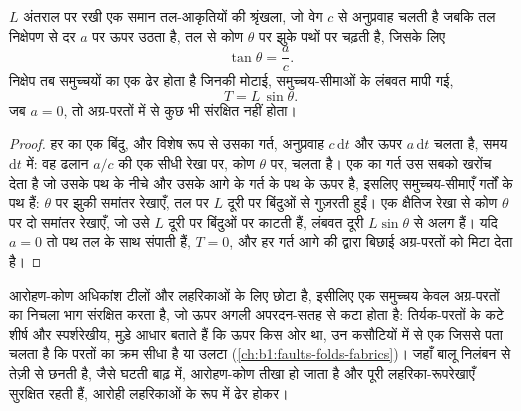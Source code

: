 \begin{proposition}[आरोही तल-आकृतियाँ]\label{prop:b1:clastic-sediments:climb}
$L$ अंतराल पर रखी एक समान तल-आकृतियों की श्रृंखला, जो वेग $c$ से अनुप्रवाह चलती है जबकि तल निक्षेपण से दर $a$ पर ऊपर उठता है, तल से कोण $\theta$ पर झुके पथों पर चढ़ती है, जिसके लिए
\[
  \tan\theta = \frac{a}{c}.
\]
निक्षेप तब  समुच्चयों का एक ढेर होता है जिनकी मोटाई, समुच्चय-सीमाओं के लंबवत मापी गई,
\[
  T = L\,\sin\theta .
\]
जब $a = 0$, तो अग्र-परतों में से कुछ भी संरक्षित नहीं होता।
\end{proposition}

\begin{proof}
हर  का एक बिंदु, और विशेष रूप से उसका गर्त, अनुप्रवाह $c\,\mathrm dt$ और ऊपर $a\,\mathrm dt$ चलता है, समय $\mathrm dt$ में: वह ढलान $a/c$ की एक सीधी रेखा पर, कोण $\theta$ पर, चलता है। एक  का गर्त उस सबको खरोंच देता है जो उसके पथ के नीचे और उसके आगे के गर्त के पथ के ऊपर है, इसलिए समुच्चय-सीमाएँ गर्तों के पथ हैं: $\theta$ पर झुकी समांतर रेखाएँ, तल पर $L$ दूरी पर बिंदुओं से गुज़रती हुईं। एक क्षैतिज रेखा से कोण $\theta$ पर दो समांतर रेखाएँ, जो उसे $L$ दूरी पर बिंदुओं पर काटती हैं, लंबवत दूरी $L\sin\theta$ से अलग हैं। यदि $a = 0$ तो पथ तल के साथ संपाती हैं, $T = 0$, और हर गर्त आगे की  द्वारा बिछाई अग्र-परतों को मिटा देता है।
\end{proof}

आरोहण-कोण अधिकांश टीलों और लहरिकाओं के लिए छोटा है, इसीलिए एक समुच्चय केवल अग्र-परतों का निचला भाग संरक्षित करता है, जो ऊपर अगली अपरदन-सतह से कटा होता है: तिर्यक-परतों के कटे शीर्ष और स्पर्शरेखीय, मुड़े आधार बताते हैं कि ऊपर किस ओर था, उन कसौटियों में से एक जिससे पता चलता है कि परतों का क्रम सीधा है या उलटा (\cref{ch:b1:faults-folds-fabrics})। जहाँ बालू निलंबन से तेज़ी से छनती है, जैसे घटती बाढ़ में, आरोहण-कोण तीखा हो जाता है और पूरी लहरिका-रूपरेखाएँ सुरक्षित रहती हैं, आरोही लहरिकाओं के रूप में ढेर होकर।

